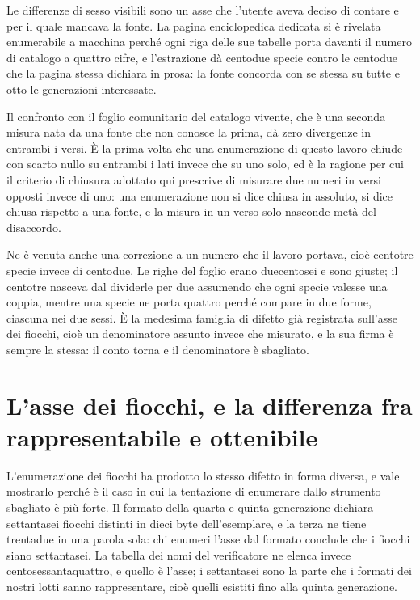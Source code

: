 Le differenze di sesso visibili sono un asse che l'utente aveva deciso di contare e per il quale mancava la fonte. La pagina enciclopedica dedicata \cite{bulbapedia-differenze-sesso} si è rivelata enumerabile a macchina perché ogni riga delle sue tabelle porta davanti il numero di catalogo a quattro cifre, e l'estrazione dà centodue specie contro le centodue che la pagina stessa dichiara in prosa: la fonte concorda con se stessa su tutte e otto le generazioni interessate.

Il confronto con il foglio comunitario del catalogo vivente, che è una seconda misura nata da una fonte che non conosce la prima, dà zero divergenze in entrambi i versi. È la prima volta che una enumerazione di questo lavoro chiude con scarto nullo su entrambi i lati invece che su uno solo, ed è la ragione per cui il criterio di chiusura adottato qui prescrive di misurare due numeri in versi opposti invece di uno: una enumerazione non si dice chiusa in assoluto, si dice chiusa rispetto a una fonte, e la misura in un verso solo nasconde metà del disaccordo.

Ne è venuta anche una correzione a un numero che il lavoro portava, cioè centotre specie invece di centodue. Le righe del foglio erano duecentosei e sono giuste; il centotre nasceva dal dividerle per due assumendo che ogni specie valesse una coppia, mentre una specie ne porta quattro perché compare in due forme, ciascuna nei due sessi. È la medesima famiglia di difetto già registrata sull'asse dei fiocchi, cioè un denominatore assunto invece che misurato, e la sua firma è sempre la stessa: il conto torna e il denominatore è sbagliato.

\section{L'asse dei fiocchi, e la differenza fra rappresentabile e ottenibile}

L'enumerazione dei fiocchi ha prodotto lo stesso difetto in forma diversa, e vale mostrarlo perché è il caso in cui la tentazione di enumerare dallo strumento sbagliato è più forte. Il formato della quarta e quinta generazione dichiara settantasei fiocchi distinti in dieci byte dell'esemplare, e la terza ne tiene trentadue in una parola sola: chi enumeri l'asse dal formato conclude che i fiocchi siano settantasei. La tabella dei nomi del verificatore ne elenca invece centosessantaquattro, e quello è l'asse; i settantasei sono la parte che i formati dei nostri lotti sanno rappresentare, cioè quelli esistiti fino alla quinta generazione.

